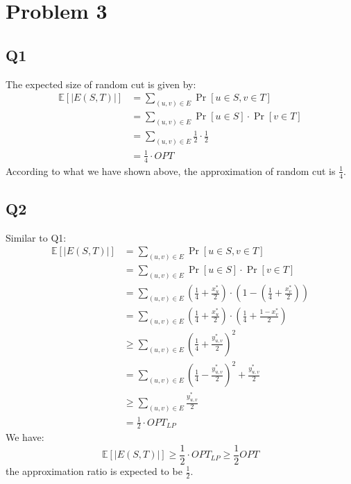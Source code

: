 \documentclass[a4paper, 12pt, titlepage]{article}
\begin{document}
\section{Problem 3}

\subsection{Q1}
The expected size of random cut is given by:
\begin{equation}
	\begin{aligned}
		\mathbb{E} \left[ | E(S,T)|\right] &= \sum_{(u,v) \in E} \Pr \left[ u \in S, v \in T \right] \\
			&= \sum_{(u,v) \in E} \Pr \left[u \in S \right] \cdot \Pr \left[ v \in T \right] \\
			&= \sum_{(u,v) \in E} \frac{1}{2} \cdot \frac{1}{2} \\
			&= \frac{1}{4} \cdot OPT
	\end{aligned}
\end{equation}
According to what we have shown above, the approximation of random cut is $\frac{1}{4}$.

\subsection{Q2}
Similar to Q1:
\begin{equation}
	\begin{aligned}
		\mathbb{E} \left[ | E(S,T)|\right] &= \sum_{(u,v) \in E} \Pr \left[ u \in S, v \in T \right] \\
			&= \sum_{(u,v) \in E} \Pr \left[u \in S \right] \cdot \Pr \left[ v \in T \right] \\
			&= \sum_{(u,v) \in E} \left(\frac{1}{4} + \frac{x_{u}^{*}}{2}\right) \cdot \left(1 - \left( \frac{1}{4} + \frac{x_{v}^{*}}{2} \right) \right) \\
			&= \sum_{(u,v) \in E} \left(\frac{1}{4} + \frac{x_{u}^{*}}{2}\right) \cdot \left(\frac{1}{4} + \frac{1 - x_{v}^{*}}{2} \right) \\
			&\geq \sum_{(u,v) \in E} \left( \frac{1}{4} + \frac{ y_{u,v}^{*} }{2} \right)^2 \\
			&= \sum_{(u,v) \in E} \left( \frac{1}{4} - \frac{ y_{u,v}^{*} }{2} \right)^2 + \frac{ y_{u,v}^{*} }{2} \\
			&\geq \sum_{(u,v) \in E} \frac{ y_{u,v}^{*} }{2} \\
			&= \frac{1}{2} \cdot OPT_{LP}
	\end{aligned}
\end{equation}
We have:
\[
	\mathbb{E} \left[ | E(S,T)|\right] \geq \frac{1}{2} \cdot OPT_{LP} \geq \frac{1}{2} OPT
\]
the approximation ratio is expected to be $\frac{1}{2}$.
\end{document}
